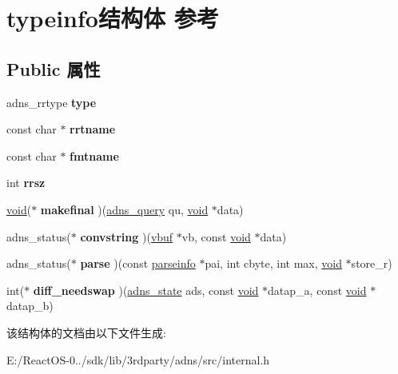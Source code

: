\hypertarget{structtypeinfo}{}\section{typeinfo结构体 参考}
\label{structtypeinfo}
\subsection*{Public 属性}
\begin{DoxyCompactItemize}
\item 
\mbox{\label{structtypeinfo_aafc6cf3a4d182d75c8fd6d5e88e6fda2}} 
adns\+\_\+rrtype {\bfseries type}
\item 
\mbox{\label{structtypeinfo_a28406f149ccf6614a5a08f6b77e687ee}} 
const char $\ast$ {\bfseries rrtname}
\item 
\mbox{\label{structtypeinfo_a8e27e1510620a94bf1c9bc03cd358ade}} 
const char $\ast$ {\bfseries fmtname}
\item 
\mbox{\label{structtypeinfo_afde2733c2639e22725e23706f604f1cd}} 
int {\bfseries rrsz}
\item 
\mbox{\label{structtypeinfo_af57a3fdf8645f1af183a4c371dd17a56}} 
\hyperlink{interfacevoid}{void}($\ast$ {\bfseries makefinal} )(\hyperlink{structadns____query}{adns\+\_\+query} qu, \hyperlink{interfacevoid}{void} $\ast$data)
\item 
\mbox{\label{structtypeinfo_a2276fa09f4916c44fa1f49318da7de72}} 
adns\+\_\+status($\ast$ {\bfseries convstring} )(\hyperlink{structvbuf}{vbuf} $\ast$vb, const \hyperlink{interfacevoid}{void} $\ast$data)
\item 
\mbox{\label{structtypeinfo_a02f4f1287859b5aa07ba25dc670ebfb7}} 
adns\+\_\+status($\ast$ {\bfseries parse} )(const \hyperlink{structparseinfo}{parseinfo} $\ast$pai, int cbyte, int max, \hyperlink{interfacevoid}{void} $\ast$store\+\_\+r)
\item 
\mbox{\label{structtypeinfo_a841093faf6722f6a9199fb1688ebb6de}} 
int($\ast$ {\bfseries diff\+\_\+needswap} )(\hyperlink{structadns____state}{adns\+\_\+state} ads, const \hyperlink{interfacevoid}{void} $\ast$datap\+\_\+a, const \hyperlink{interfacevoid}{void} $\ast$datap\+\_\+b)
\end{DoxyCompactItemize}


该结构体的文档由以下文件生成\+:\begin{DoxyCompactItemize}
\item 
E\+:/\+React\+O\+S-\/0../sdk/lib/3rdparty/adns/src/internal.\+h\end{DoxyCompactItemize}
